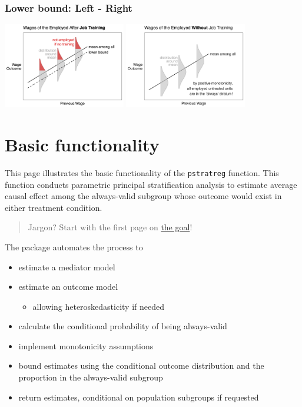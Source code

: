 \documentclass[
]{book}
\providecommand{\tightlist}{%
  \setlength{\itemsep}{0pt}\setlength{\parskip}{0pt}}
\begin{document}
\subsection{Lower bound: Left - Right}\label{lower-bound-left---right}

\includegraphics[width=0.4\textwidth,height=\textheight]{assets/teach_jobtrain_lower.png}
\includegraphics[width=0.4\textwidth,height=\textheight]{assets/teach_jobtrain_control.png}

\chapter{Basic functionality}\label{basic-functionality}

This page illustrates the basic functionality of the \texttt{pstratreg} function. This function conducts parametric principal stratification analysis to estimate average causal effect among the always-valid subgroup whose outcome would exist in either treatment condition.

\begin{quote}
Jargon? Start with the first page on \hyperref[the-goal]{the goal}!
\end{quote}

The package automates the process to

\begin{itemize}
\tightlist
\item
  estimate a mediator model
\item
  estimate an outcome model

  \begin{itemize}
  \tightlist
  \item
    allowing heteroskedasticity if needed
  \end{itemize}
\item
  calculate the conditional probability of being always-valid
\item
  implement monotonicity assumptions
\item
  bound estimates using the conditional outcome distribution and the proportion in the always-valid subgroup
\item
  return estimates, conditional on population subgroups if requested
\end{itemize}
\end{document}
